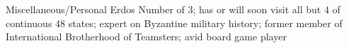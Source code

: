 \documentclass{resume} %
\begin{document}

\begin{rSection}{Miscellaneous/Personal} 
    Erdos Number of 3; has or will soon visit all but 4 of continuous 48 states; expert on Byzantine military history; former member of International Brotherhood of Teamsters; avid board game player 
\end{rSection}






\end{document}
